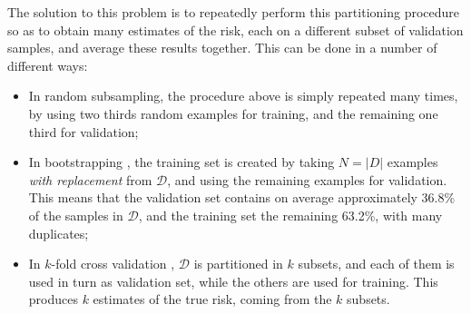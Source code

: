 \documentclass[a4paper,11pt]{kth-mag}
\begin{document}
The solution to this problem is to repeatedly perform this partitioning procedure so as to obtain many estimates of the risk, each on a different subset of validation samples, and average these results together. This can be done in a number of different ways:

\begin{itemize}
\item In random subsampling, the procedure above is simply repeated many times, by using two thirds random examples for training, and the remaining one third for validation;
\item In bootstrapping \citep{bootstrap}, the training set is created by taking $N=\vert D\vert$ examples \emph{with replacement} from $\mathcal{D}$, and using the remaining examples for validation. This means that the validation set contains on average approximately 36.8\% of the samples in $\mathcal{D}$, and the training set the remaining 63.2\%, with many duplicates;
\item In $k$-fold cross validation \citep{kfold}, $\mathcal{D}$ is partitioned in $k$ subsets, and each of them is used in turn as validation set, while the others are used for training. This produces $k$ estimates of the true risk, coming from the $k$ subsets.
\end{itemize}
\end{document}
